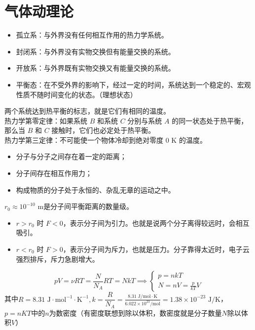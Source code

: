 \documentclass[lang=cn,11pt]{elegantbook}
\begin{document}
\chapter{气体动理论}

\begin{definition}
\begin{itemize}
\item 孤立系：与外界没有任何相互作用的热力学系统。
\item 封闭系：与外界没有实物交换但有能量交换的系统。
\item 开放系：与外界既有实物交换又有能量交换的系统。
\item 平衡态：在不受外界的影响下，经过一定的时间，系统达到一个稳定的、宏观性质不随时间变化的状态。（理想状态）
\end{itemize}
两个系统达到热平衡的标志，就是它们有相同的温度。\\
热力学第零定律：如果系统 \(B\) 和系统 \(C\) 分别与系统 \(A\) 的同一状态处于热平衡，那么当 \(B\) 和 \(C\) 接触时，它们也必定处于热平衡。\\
热力学第三定律：不可能使一个物体冷却到绝对零度 \(0\text{ K}\) 的温度。
\end{definition}

\begin{definition}[分子动理论的基本模型]
    \begin{itemize}
    \item 分子与分子之间存在着一定的距离；
    \item 分子间存在相互作用力；
    \item 构成物质的分子处于永恒的、杂乱无章的运动之中。
    \end{itemize}
    \(r_0\approx10^{-10}\text{ m}\)是分子间平衡距离的数量级。
    \begin{itemize}
    \item \(r>r_0\text{ 时 }F<0\)，表示分子间为引力。也就是说两个分子离得较远时，会相互吸引。
    \item \(r<r_0\text{ 时 }F>0\)，表示分子间为斥力，也就是压力。分子靠得太近时，电子云强烈排斥，斥力急剧增大。
    \end{itemize}
\end{definition}

\begin{definition}[理想气体状态方程及其简要形式]
\[pV=\nu RT=\frac{N}{N_A}RT=NkT\implies \begin{cases}p=nkT\\N=nV=\frac{p}{kT}V\end{cases}\]其中$R=8.31\text{ J}\cdot\text{mol}^{-1}\cdot\text{K}^{-1},k=\dfrac{R}{N_A}=\frac{8.31\text{ J/mol}\cdot\text{K}}{6.022\times10^{23}\text{/mol}}=1.38\times10^{-23}\text{ J/K}$，$p=nKT$中的$n$为数密度（有密度联想到除以体积，数密度就是分子数量$N$除以体积$V$）
\end{definition}
\end{document}
